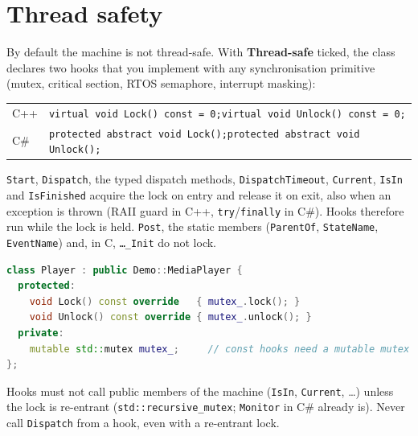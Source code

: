 \documentclass[11pt,a4paper,openany]{report}
\newcommand{\ui}[1]{\textsf{\textbf{#1}}}
\newcommand{\code}[1]{\texttt{#1}}
\begin{document}
\section{Thread safety}
\label{sec:threads}
By default the machine is not thread-safe. With \ui{Thread-safe} ticked, the class declares two hooks
that you implement with any synchronisation primitive (mutex, critical section, RTOS semaphore,
interrupt masking):
\begin{center}
\begin{tabularx}{\linewidth}{@{}lX@{}}
\toprule
C++  & \code{virtual void Lock() const = 0;}\quad\code{virtual void Unlock() const = 0;} \\
C\#  & \code{protected abstract void Lock();}\quad\code{protected abstract void Unlock();} \\
\bottomrule
\end{tabularx}
\end{center}
\code{Start}, \code{Dispatch}, the typed dispatch methods, \code{DispatchTimeout}, \code{Current},
\code{IsIn} and \code{IsFinished} acquire the lock on entry and release it on exit, also when an
exception is thrown (RAII guard in C++, \code{try}/\code{finally} in C\#). Hooks therefore run while
the lock is held. \code{Post}, the static members (\code{ParentOf}, \code{StateName},
\code{EventName}) and, in C, \code{\dots\_Init} do not lock.

\begin{lstlisting}[language=C++]
class Player : public Demo::MediaPlayer {
  protected:
    void Lock() const override   { mutex_.lock(); }
    void Unlock() const override { mutex_.unlock(); }
  private:
    mutable std::mutex mutex_;     // const hooks need a mutable mutex
};
\end{lstlisting}

\begin{caution}
Hooks must not call public members of the machine (\code{IsIn}, \code{Current}, \dots) unless the lock
is re-entrant (\code{std::recursive\_mutex}; \code{Monitor} in C\# already is). Never call
\code{Dispatch} from a hook, even with a re-entrant lock.
\end{caution}
\end{document}
